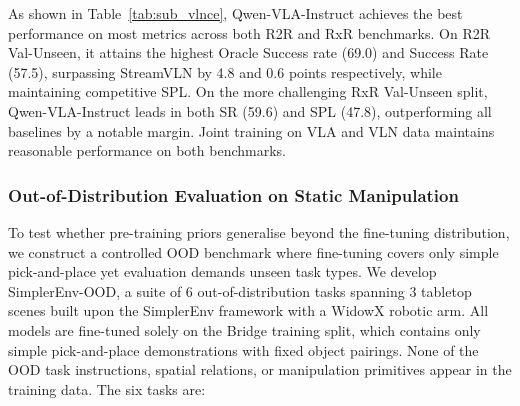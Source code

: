 \documentclass{article}
\begin{document}
As shown in Table~\ref{tab:sub_vlnce}, Qwen-VLA-Instruct achieves the best performance on most metrics across both R2R and RxR benchmarks. On R2R Val-Unseen, it attains the highest Oracle Success rate (69.0) and Success Rate (57.5), surpassing StreamVLN by 4.8 and 0.6 points respectively, while maintaining competitive SPL. On the more challenging RxR Val-Unseen split, Qwen-VLA-Instruct leads in both SR (59.6) and SPL (47.8), outperforming all baselines by a notable margin. Joint training on VLA and VLN data maintains reasonable performance on both benchmarks.



\subsubsection{Out-of-Distribution Evaluation on Static Manipulation}
To test whether pre-training priors generalise beyond the fine-tuning
  distribution, we construct a controlled OOD benchmark where fine-tuning
  covers only simple pick-and-place yet evaluation demands unseen task types.
We develop SimplerEnv-OOD, a suite of 6 out-of-distribution tasks spanning 3 tabletop scenes built upon the SimplerEnv framework with a WidowX robotic arm. All models are fine-tuned solely on the Bridge training split, which contains only simple pick-and-place demonstrations with fixed object pairings. None of the OOD task instructions, spatial relations, or manipulation primitives appear in the training data. The six tasks are:
\end{document}
